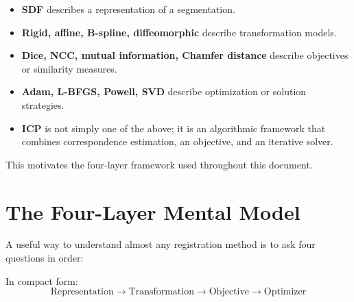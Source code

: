 \documentclass[11pt,a4paper]{article}
\begin{document}
\begin{itemize}
  \item \textbf{SDF} describes a representation of a segmentation.
  \item \textbf{Rigid, affine, B-spline, diffeomorphic} describe transformation models.
  \item \textbf{Dice, NCC, mutual information, Chamfer distance} describe objectives or similarity measures.
  \item \textbf{Adam, L-BFGS, Powell, SVD} describe optimization or solution strategies.
  \item \textbf{ICP} is not simply one of the above; it is an algorithmic framework that combines correspondence estimation, an objective, and an iterative solver.
\end{itemize}

This motivates the four-layer framework used throughout this document.

\section{The Four-Layer Mental Model}

A useful way to understand almost any registration method is to ask four questions in order:

\begin{center}
\end{center}

In compact form:
\[
\boxed{
\text{Representation}
\rightarrow
\text{Transformation}
\rightarrow
\text{Objective}
\rightarrow
\text{Optimizer}
}
\]
\end{document}
